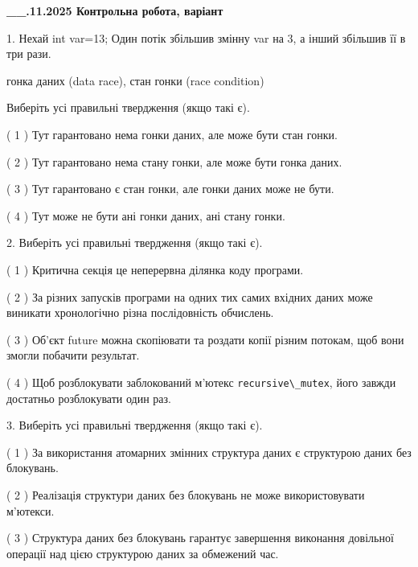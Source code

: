 \documentclass[12pt, ukrainian]{article}
\def\code#1{\Verb!#1!}
\begin{document}
\newpage
\begin {large}

\textbf{\_\_.11.2025 Контрольна робота, варіант  }\par


{
1. Нехай int var=13; Один потік збільшив змінну var на 3, а інший збільшив її в три рази.

гонка даних (data race), стан гонки (race condition)

Виберіть усі правильні твердження (якщо такі є).\par
\vspace{2mm}
( 1 ) Тут гарантовано нема гонки даних, але може бути стан гонки.%

( 2 ) Тут гарантовано нема стану гонки, але може бути гонка даних.%

( 3 ) Тут гарантовано є стан гонки, але гонки даних може не бути.%

( 4 ) Тут може не бути ані гонки даних, ані стану гонки.%


2. Виберіть усі правильні твердження (якщо такі є).\par
\vspace{2mm}

( 1 ) Критична секція це неперервна ділянка коду програми.%

( 2 ) За різних запусків програми на одних тих самих вхідних даних може виникати хронологічно різна послідовність обчислень.%

( 3 ) Об’єкт future можна скопіювати та роздати копії різним потокам, щоб вони змогли побачити результат.%

( 4 ) Щоб розблокувати заблокований м’ютекс \code{recursive\_mutex}, його завжди достатньо розблокувати один раз.%


3. Виберіть усі правильні твердження (якщо такі є).\par
\vspace{2mm}

( 1 ) За використання атомарних змінних структура даних є структурою даних без блокувань.%

( 2 ) Реалізація структури даних без блокувань не може використовувати м’ютекси.%

( 3 ) Структура даних без блокувань гарантує завершення виконання довільної операції над цією структурою даних за обмежений час.%

}
\end{large}
\end{document}
